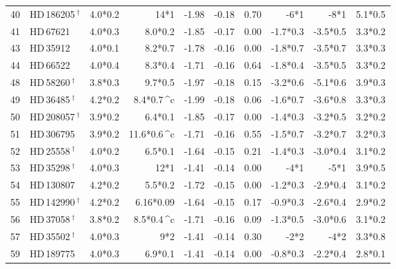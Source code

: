 \begin{tabular}{l l D{*}{\,\pm\,}{4,4} D{*}{\,\pm\,}{4,4} D{.}{.}{2,2} D{.}{.}{2,2} D{.}{.}{2,2} D{*}{\,\pm\,}{4,4} D{*}{\,\pm\,}{4,4} D{*}{\,\pm\,}{3,3}}
40 & HD\,186205\,$^\dagger$ & 4.0*0.2 & 14*1 & -1.98 & -0.18 & 0.70 & -6*1 & -8*1 & 5.1*0.5 \\ 

41 & HD\,67621 & 4.0*0.3 & 8.0*0.2 & -1.85 & -0.17 & 0.00 & -1.7*0.3 & -3.5*0.5 & 3.3*0.2 \\ 

43 & HD\,35912 & 4.0*0.1 & 8.2*0.7 & -1.78 & -0.16 & 0.00 & -1.8*0.7 & -3.5*0.7 & 3.3*0.3 \\ 

44 & HD\,66522 & 4.0*0.4 & 8.3*0.4 & -1.71 & -0.16 & 0.64 & -1.8*0.4 & -3.5*0.5 & 3.3*0.2 \\ 

48 & HD\,58260\,$^\dagger$ & 3.8*0.3 & 9.7*0.5 & -1.97 & -0.18 & 0.15 & -3.2*0.6 & -5.1*0.6 & 3.9*0.3 \\ 

49 & HD\,36485\,$^\dagger$ & 4.2*0.2 & 8.4*0.7\,^{c} & -1.99 & -0.18 & 0.06 & -1.6*0.7 & -3.6*0.8 & 3.3*0.3 \\ 

50 & HD\,208057\,$^\dagger$ & 3.9*0.2 & 6.4*0.1 & -1.85 & -0.17 & 0.00 & -1.4*0.3 & -3.2*0.5 & 3.2*0.2 \\ 

51 & HD\,306795 & 3.9*0.2 & 11.6*0.6\,^{c} & -1.71 & -0.16 & 0.55 & -1.5*0.7 & -3.2*0.7 & 3.2*0.3 \\ 

52 & HD\,25558\,$^\dagger$ & 4.0*0.2 & 6.5*0.1 & -1.64 & -0.15 & 0.21 & -1.4*0.3 & -3.0*0.4 & 3.1*0.2 \\ 

53 & HD\,35298\,$^\dagger$ & 4.0*0.3 & 12*1 & -1.41 & -0.14 & 0.00 & -4*1 & -5*1 & 3.9*0.5 \\ 

54 & HD\,130807 & 4.2*0.2 & 5.5*0.2 & -1.72 & -0.15 & 0.00 & -1.2*0.3 & -2.9*0.4 & 3.1*0.2 \\ 

55 & HD\,142990\,$^\dagger$ & 4.2*0.2 & 6.16*0.09 & -1.64 & -0.15 & 0.17 & -0.9*0.3 & -2.6*0.4 & 2.9*0.2 \\ 

56 & HD\,37058\,$^\dagger$ & 3.8*0.2 & 8.5*0.4\,^{c} & -1.71 & -0.16 & 0.09 & -1.3*0.5 & -3.0*0.6 & 3.1*0.2 \\ 

57 & HD\,35502\,$^\dagger$ & 4.0*0.3 & 9*2 & -1.41 & -0.14 & 0.30 & -2*2 & -4*2 & 3.3*0.8 \\ 

59 & HD\,189775 & 4.0*0.3 & 6.9*0.1 & -1.41 & -0.14 & 0.00 & -0.8*0.3 & -2.2*0.4 & 2.8*0.1 \\ 


\end{tabular}
